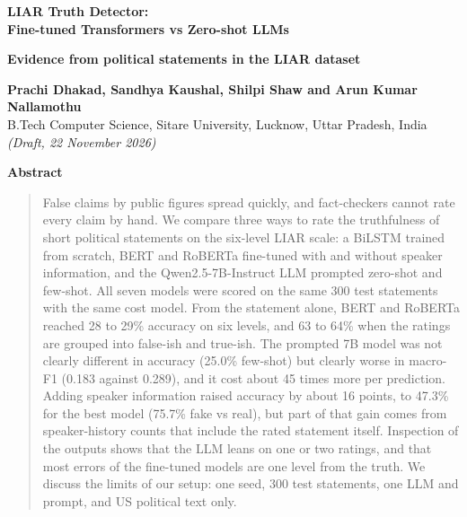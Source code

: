 \documentclass[10pt,a4paper,twoside]{article}
\begin{document}
\begin{center}
{\LARGE\bfseries LIAR Truth Detector:\\[2pt] Fine-tuned Transformers vs Zero-shot LLMs\par}
\vspace{4pt}
{\large\bfseries Evidence from political statements in the LIAR dataset\par}
\vspace{10pt}
{\bfseries Prachi Dhakad, Sandhya Kaushal, Shilpi Shaw and Arun Kumar Nallamothu}\\[3pt]
B.Tech Computer Science, Sitare University, Lucknow, Uttar Pradesh, India\\[3pt]
\textit{(Draft, 22 November 2026)}
\end{center}

\begin{center}\textbf{\small Abstract}\end{center}
\vspace{-6pt}
\begin{quote}\small{}
False claims by public figures spread quickly, and fact-checkers cannot rate every claim by hand. We compare three ways to rate the truthfulness of short political statements on the six-level LIAR scale: a BiLSTM trained from scratch, BERT and RoBERTa fine-tuned with and without speaker information, and the Qwen2.5-7B-Instruct LLM prompted zero-shot and few-shot. All seven models were scored on the same 300 test statements with the same cost model. From the statement alone, BERT and RoBERTa reached 28 to 29\% accuracy on six levels, and 63 to 64\% when the ratings are grouped into false-ish and true-ish. The prompted 7B model was not clearly different in accuracy (25.0\% few-shot) but clearly worse in macro-F1 (0.183 against 0.289), and it cost about 45 times more per prediction. Adding speaker information raised accuracy by about 16 points, to 47.3\% for the best model (75.7\% fake vs real), but part of that gain comes from speaker-history counts that include the rated statement itself. Inspection of the outputs shows that the LLM leans on one or two ratings, and that most errors of the fine-tuned models are one level from the truth. We discuss the limits of our setup: one seed, 300 test statements, one LLM and prompt, and US political text only.
\end{quote}
\end{document}
